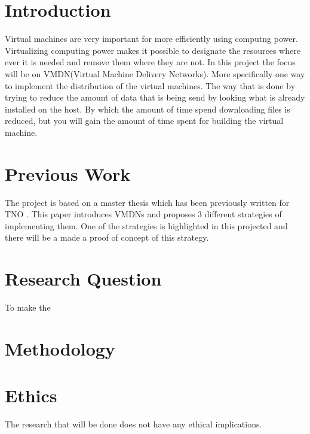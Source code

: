 \documentclass[A4]{article}
\begin{document}
\section{Introduction}
Virtual machines are very important for more efficiently using computng power. Virtualizing computing power makes it possible to designate the resources where ever it is needed and remove them where they are not. In this project the focus will be on VMDN(Virtual Machine Delivery Networks). More specifically one way to implement the distribution of the virtual machines. The way that is done by trying to reduce the amount of data that is being send by looking what is already installed on the host. By which the amount of time spend downloading files is reduced, but you will gain the amount of time spent for building the virtual machine.

\section{Previous Work}
The project is based on a master thesis which has been previously written for TNO \cite{vmdn1}. This paper introduces VMDNs and proposes 3 different strategies of implementing them. One of the strategies is highlighted in this projected and there will be a made a proof of concept of this strategy.

\section{Research Question}
To make the 

\section{Methodology}

\section{Ethics}
The research that will be done does not have any ethical implications.



\end{document}
